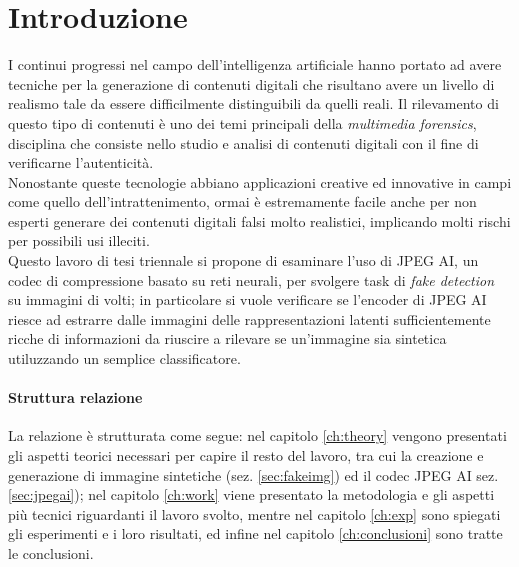 \chapter*{Introduzione}\label{ch:intro}
I continui progressi nel campo dell'intelligenza artificiale hanno portato ad avere tecniche per la generazione di contenuti digitali che risultano avere un livello di realismo tale da essere difficilmente distinguibili da quelli reali.
Il rilevamento di questo tipo di contenuti è uno dei temi principali della \textit{multimedia forensics}, disciplina che consiste nello studio e analisi di contenuti digitali con il fine di verificarne l'autenticità.\\
Nonostante queste tecnologie abbiano applicazioni creative ed innovative in campi come quello dell'intrattenimento, ormai è estremamente facile anche per non esperti generare dei contenuti digitali falsi molto realistici, implicando molti rischi per possibili usi illeciti.\\
Questo lavoro di tesi triennale si propone di esaminare l'uso di JPEG AI, un codec di compressione basato su reti neurali, per svolgere task di \textit{fake detection} su immagini di volti; in particolare si vuole verificare se l'encoder di JPEG AI riesce ad estrarre dalle immagini delle rappresentazioni latenti sufficientemente ricche di informazioni da riuscire a rilevare se un'immagine sia sintetica utiluzzando un semplice classificatore.
\subsubsection*{Struttura relazione}
La relazione è strutturata come segue: nel capitolo \ref{ch:theory} vengono presentati gli aspetti teorici necessari per capire il resto del lavoro, tra cui la creazione e generazione di immagine sintetiche (sez. \ref{sec:fakeimg}) ed il codec JPEG AI sez. \ref{sec:jpegai}); nel capitolo \ref{ch:work} viene presentato la metodologia e gli aspetti più tecnici riguardanti il lavoro svolto, mentre nel capitolo \ref{ch:exp} sono spiegati gli esperimenti e i loro risultati, ed infine nel capitolo \ref{ch:conclusioni} sono tratte le conclusioni.

